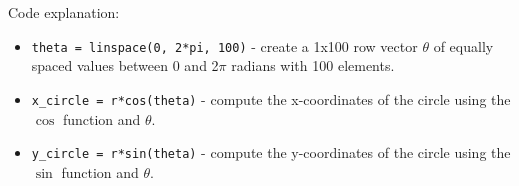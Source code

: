 \vspace*{1cm}

Code explanation:
\begin{itemize}
  \item \texttt{\color{mygreen}theta = linspace(0, 2*pi, 100)} - create a 1x100 row vector $\theta$ of equally spaced values between 0 and 2$\pi$ radians with 100 elements.
  \item \texttt{\color{mygreen}x\_circle = r*cos(theta)} - compute the x-coordinates of the circle using the $\cos$ function and $\theta$.
  \item \texttt{\color{mygreen}y\_circle = r*sin(theta)} - compute the y-coordinates of the circle using the $\sin$ function and $\theta$.
\end{itemize}

\vspace*{2cm}